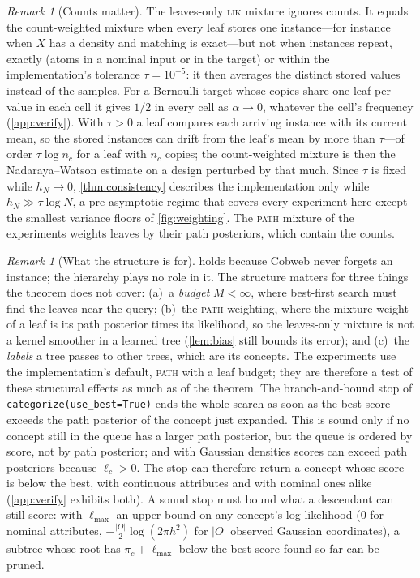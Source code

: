 \documentclass[11pt]{article}
\theoremstyle{definition}
\theoremstyle{remark}
\newtheorem{remark}[theorem]{Remark}
\begin{document}
\begin{remark}[Counts matter]\label{rem:counts}
The leaves-only \textsc{lik} mixture ignores counts.  It equals the count-weighted mixture
when every leaf stores one instance---for instance when $X$ has a density and matching is
exact---but not when instances repeat, exactly (atoms in a nominal input or in the target)
or within the implementation's tolerance $\tau=10^{-5}$: it then averages the distinct
stored values instead of the samples.  For a Bernoulli target whose copies share one leaf
per value in each cell it gives $1/2$ in every cell as $\alpha\to0$, whatever the cell's
frequency (\cref{app:verify}).  With $\tau>0$ a leaf compares each arriving instance with its current
mean, so the stored instances can drift from the leaf's mean by more than $\tau$---of order
$\tau\log n_c$ for a leaf with $n_c$ copies; the count-weighted mixture is then the
Nadaraya--Watson estimate on a design perturbed by that much.  Since $\tau$ is fixed while
$h_N\to0$, \cref{thm:consistency} describes the implementation only while
$h_N\gg\tau\log N$, a pre-asymptotic regime that covers every experiment here except the
smallest variance floors of \cref{fig:weighting}.  The
\textsc{path} mixture of the experiments weights leaves by their path posteriors, which
contain the counts.
\end{remark}

\begin{remark}[What the structure is for]\label{rem:structure}
 holds because Cobweb never forgets an instance; the hierarchy
plays no role in it.  The structure matters for three things the theorem does not
cover: (a)~a \emph{budget} $M<\infty$, where best-first search must find the leaves
near the query; (b)~the \textsc{path} weighting, where the mixture weight of a leaf is
its path posterior times its likelihood, so the leaves-only mixture is not a kernel
smoother in a learned tree (\cref{lem:bias} still bounds its error); and (c)~the
\emph{labels} a tree passes to other trees, which are its concepts.  The experiments use
the implementation's default, \textsc{path} with a leaf budget; they are therefore a
test of these structural effects as much as of the theorem.  The branch-and-bound stop
of \texttt{categorize(use\_best=True)} ends the whole search as soon as the best score
exceeds the path posterior of the concept just expanded.  This is sound only if no concept
still in the queue has a larger path posterior, but the queue is ordered by score, not by
path posterior; and with Gaussian densities scores can exceed path posteriors because
$\ell_c>0$.  The stop can therefore return a concept whose score is below the best, with
continuous attributes and with nominal ones alike (\cref{app:verify} exhibits both).
A sound stop must bound what a descendant can still score: with $\ell_{\max}$ an upper
bound on any concept's log-likelihood ($0$ for nominal attributes,
$-\tfrac{|O|}2\log(2\pi h^2)$ for $|O|$ observed Gaussian coordinates), a subtree whose root
has $\pi_c+\ell_{\max}$ below the best score found so far can be pruned.
\end{remark}
\end{document}

